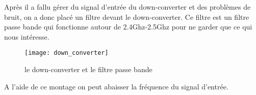 Après il a fallu gérer du signal d’entrée du down-converter et des problèmes de bruit, on a donc placé un filtre devant le down-converter. Ce filtre est un filtre passe bande qui fonctionne autour de 2.4Ghz-2.5Ghz pour ne garder que ce qui nous intéresse.


\begin{figure}[h]
  \centering
  \texttt{[image: down\_converter]}
  \caption{le down-converter et le filtre passe bande}
  \label{fig:down}
\end{figure}

A l’aide de ce montage on peut abaisser la fréquence du signal d’entrée.

